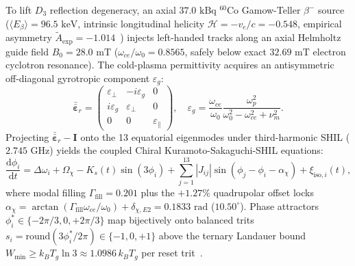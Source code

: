 \documentclass[aps,pra,twocolumn,superscriptaddress,nofootinbib,10pt]{revtex4-2}
\begin{document}
To lift $D_3$ reflection degeneracy, an axial $37.0\text{ kBq}$ $^{60}\text{Co}$
Gamow-Teller $\beta^-$ source ($\langle E_\beta \rangle = 96.5\text{ keV}$,
intrinsic longitudinal helicity $\mathcal{H} = -v_e/c = -0.548$, empirical
asymmetry $\tilde{A}_{\text{exp}} = -1.014$~\cite{Wu1957,Wauters2010}) injects
left-handed tracks along an axial Helmholtz guide field $B_0 = 28.0\text{ mT}$
($\omega_{ce}/\omega_0 = 0.8565$, safely below exact $32.69\text{ mT}$ electron
cyclotron resonance). The cold-plasma permittivity acquires an antisymmetric
off-diagonal gyrotropic component $\varepsilon_g$:
\begin{equation}
\bar{\bar{\bm{\varepsilon}}}_r =
\begin{pmatrix}
\varepsilon_\perp & -i\varepsilon_g & 0 \\
i\varepsilon_g & \varepsilon_\perp & 0 \\
0 & 0 & \varepsilon_\parallel
\end{pmatrix}, \quad
\varepsilon_g = \frac{\omega_{ce}}{\omega_0}
\frac{\omega_p^2}{\omega_0^2 - \omega_{ce}^2 + \nu_m^2}.
\label{eq:gyro}
\end{equation}
Projecting $\bar{\bar{\bm{\varepsilon}}}_r - \bm{I}$ onto the 13 equatorial
eigenmodes under third-harmonic SHIL ($2.745\text{ GHz}$) yields the coupled
Chiral Kuramoto-Sakaguchi-SHIL equations:
\begin{equation}
\frac{\mathrm{d}\phi_i}{\mathrm{d}t}
= \Delta\omega_i + \Omega_\chi - K_s(t)\sin(3\phi_i)
+ \sum_{j=1}^{13} |J_{ij}|\sin(\phi_j - \phi_i - \alpha_\chi)
+ \xi_{\text{iso},i}(t),
\label{eq:ckss}
\end{equation}
where modal filling $\Gamma_{\text{fill}} = 0.201$ plus the $+1.27\%$
quadrupolar offset locks $\alpha_\chi = \arctan(\Gamma_{\text{fill}}
\omega_{ce}/\omega_0) + \delta_{\chi,E2} = 0.1833\text{ rad}$ ($10.50^\circ$).
Phase attractors $\phi_i^* \in \{-2\pi/3, 0, +2\pi/3\}$ map bijectively onto
balanced trits $s_i = \mathrm{round}(3\phi_i^*/2\pi) \in \{-1, 0, +1\}$ above
the ternary Landauer bound $W_{\min} \ge k_B T_g \ln 3 \approx 1.0986\,k_B T_g$
per reset trit~\cite{Landauer1961,GrimmKembali2026}.
\end{document}
